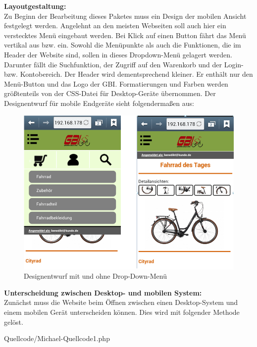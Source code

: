 \newpage
\textbf{Layoutgestaltung:}\\
Zu Beginn der Bearbeitung dieses Paketes muss ein Design der mobilen Ansicht festgelegt werden. Angelehnt an den meisten Webseiten soll auch hier ein verstecktes Menü eingebaut werden. Bei Klick auf einen Button fährt das Menü vertikal aus bzw. ein. Sowohl die Menüpunkte als auch die Funktionen, die im Header der Website sind, sollen in dieses Dropdown-Menü gelagert werden. Darunter fällt die Suchfunktion, der Zugriff auf den Warenkorb und der Login- bzw. Kontobereich. Der Header wird dementsprechend kleiner. Er enthält nur den Menü-Button und das Logo der GBI.
Formatierungen und Farben werden größtenteils von der CSS-Datei für Desktop-Geräte übernommen. 
Der Designentwurf für mobile Endgeräte sieht folgendermaßen aus:


\begin{figure}[H]
\begin{center}
\includegraphics[width=12cm]{Bilder/Michael_Abbildung3-DesingentwurfMitUndOhneDropDownMenue.png}
\end{center}
\caption{Designentwurf mit und ohne Drop-Down-Menü}
\end{figure}


\textbf{Unterscheidung zwischen Desktop- und mobilen System:}
\\
Zunächst muss die Website beim Öffnen zwischen einen Desktop-System und einem mobilen Gerät unterscheiden können. Dies wird mit folgender Methode gelöst.

\begin{center}
	\begin{lstinputlisting}[language=PHP, caption={Unterscheidung Desktop und mobiles Gerät}]
		{Quellcode/Michael-Quellcode1.php}
	\end{lstinputlisting}
\end{center}

